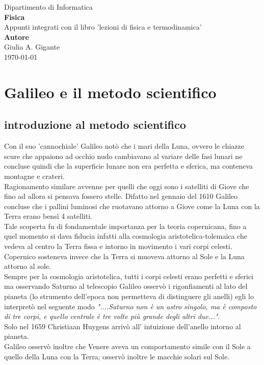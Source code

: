 \documentclass[a4paper,11pt,oneside]{book}
\theoremstyle{dispense}
\begin{document}
\begin{titlepage}
    \centering
    \vspace*{2cm}

    {\large Dipartimento di Informatica}\\[3cm]
    {\Huge \bfseries Fisica}\\[0.5cm]
    {\Large Appunti integrati con il libro 'lezioni di fisica e termodinamica'}\\[4cm]
    \textbf{Autore}\\
    Giulia A. Gigante\\[1cm]
    \vfill
    {\large \today}
\end{titlepage}

\frontmatter
\tableofcontents

\mainmatter

\chapter{Galileo e il metodo scientifico}
\section{introduzione al metodo scientifico}
Con il suo 'cannochiale' Galileo notò che i mari della Luna, ovvero le chiazze scure che appaiono ad occhio nudo cambiavano al variare delle fasi lunari ne concluse quindi che la superficie lunare non era perfetta e sferica, ma conteneva montagne e crateri.\\
Ragionamento similare avvenne per quelli che oggi sono i satelliti di Giove che fino ad allora si pensava fossero stelle. Difatto nel gennaio del 1610 Galileo concluse che i pallini luminosi che ruotavano attorno a Giove come la Luna con la Terra erano bensì 4 satelliti. \\
Tale scoperta fu di fondamentale importanza per la teoria copernicana, fino a quel momento si dava fiducia infatti alla cosmologia aristotelica-tolemaica che vedeva al centro la Terra fissa e intorno in movimento i vari corpi celesti.
Copernico sosteneva invece che la Terra si muoveva attorno al Sole e la Luna attorno al sole. \\
Sempre per la cosmologia aristotelica, tutti i corpi celesti erano perfetti e sferici ma osservando Saturno al telescopio  Galileo osservò i rigonfiamenti al lato del pianeta (lo strumento dell'epoca non permetteva di distinguere gli anelli) egli lo interpretò nel seguente modo  \textit{ "....Saturno non è un astro singolo, ma è composto di tre corpi, e quello centrale è tre volte più  grande degli altri due..."}. \\
Solo nel 1659 Christiaan Huygens arrivò all' intuizione dell'anello intorno al pianeta.\\
Galileo osservò inoltre che Venere aveva un comportamento simile con il Sole  a quello della Luna con la Terra; osservò inoltre le macchie solari sul Sole.\\
\end{document}
